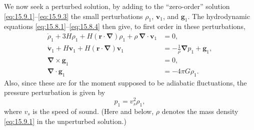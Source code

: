 We now seek a perturbed solution, by adding to the ``zero-order'' solution
\eqref{eq:15.9.1}--\eqref{eq:15.9.3} the small perturbations
\(\rho_1\), \(\mathbf v_1\), and \(\mathbf g_1\). The hydrodynamic
equations \eqref{eq:15.8.1}--\eqref{eq:15.8.4} then give, to first order
in these perturbations,
\begin{align}
  \dot\rho_1
  +3H\rho_1
  +H(\mathbf r\cdot\boldsymbol{\nabla})\rho_1
  +\rho\,\boldsymbol{\nabla}\cdot\mathbf v_1
  &=0,
  \tag{15.9.6}\label{eq:15.9.6}\\
  \dot{\mathbf v}_1
  +H\mathbf v_1
  +H(\mathbf r\cdot\boldsymbol{\nabla})\mathbf v_1
  &=
  -\frac1\rho\boldsymbol{\nabla}p_1+\mathbf g_1,
  \tag{15.9.7}\label{eq:15.9.7}\\
  \boldsymbol{\nabla}\times\mathbf g_1
  &=0,
  \tag{15.9.8}\label{eq:15.9.8}\\
  \boldsymbol{\nabla}\cdot\mathbf g_1
  &=-4\pi G\rho_1.
  \tag{15.9.9}\label{eq:15.9.9}
\end{align}
Also, since these are for the moment supposed to be adiabatic fluctuations,
the pressure perturbation is given by
\begin{equation}
  p_1=v_s^2\rho_1,
  \tag{15.9.10}\label{eq:15.9.10}
\end{equation}
where \(v_s\) is the speed of sound. (Here and below, \(\rho\) denotes the
mass density \eqref{eq:15.9.1} in the unperturbed solution.)

